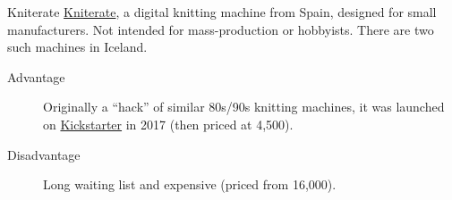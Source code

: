 \documentclass[
    NAME={Dr. Helga Ingimundardóttir},
    EMAIL={helgaingim@hi.is},
    FACULTY={Industrial Engineering},
    TITLE={HiDef Textiles: Reviving Tradition with Innovation},
    SUBTITLE={Empowering Creativity and Sustainability in Textile Production through Digital Transformation},
    SEMINAR={Reykjavík DataBeers},
    DATE={January 25, 2025},
    WIDE={true}
]{HI-LaTeX/hi-beamer}
\begin{document}
\begin{frame}{Kniterate}
\href{https://www.kniterate.com/product/kniterate-the-digital-knitting-machine/}{Kniterate}, a digital knitting machine from Spain, designed for small manufacturers. Not intended for mass-production or hobbyists. There are two such machines in Iceland.

\begin{description}
    \item[Advantage] Originally a ``hack'' of similar 80s/90s knitting machines, it was launched on \href{https://www.kickstarter.com/projects/kniterate/kniterate-the-digital-knitting-machine/}{Kickstarter} in 2017 (then priced at \texteuro{}4,500).
    \item[Disadvantage] Long waiting list and expensive (priced from \texteuro{}16,000).
\end{description}


\end{frame}
\end{document}
